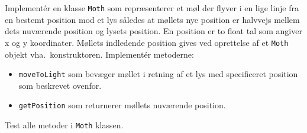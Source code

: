 Implementér en klasse \texttt{Moth} som repræsenterer et møl der flyver i en lige linje fra en bestemt position mod et lys således at møllets nye position er halvvejs mellem dets nuværende position og lysets position.  En position er to float tal som angiver x og y koordinater. Møllets indledende position gives ved oprettelse af et \texttt{Moth} objekt vha.\ konstruktoren.  Implementér metoderne:
  \begin{itemize}
\item \texttt{moveToLight} som bevæger møllet i retning af et lys med specificeret position som beskrevet ovenfor.
\item \texttt{getPosition} som returnerer møllets nuværende position.
\end{itemize}
Test alle metoder i \texttt{Moth} klassen.
